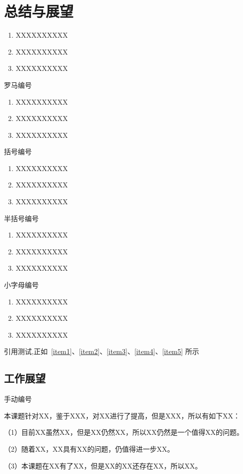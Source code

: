 \lipsum

\newpage    %


\section{总结与展望}

\begin{enumerate}
 \item XXXXXXXXXX
 \label{item1}
 \item XXXXXXXXXX
 \item XXXXXXXXXX
\end{enumerate}
罗马编号
\begin{enumerate}[label=(\roman*)]
 \item XXXXXXXXXX
 \label{item2}
 \item XXXXXXXXXX
 \item XXXXXXXXXX
\end{enumerate}
括号编号
\begin{enumerate}[label=(\arabic*)]
 \item XXXXXXXXXX
 \label{item3}
 \item XXXXXXXXXX
 \item XXXXXXXXXX
\end{enumerate}
半括号编号
\begin{enumerate}[label=\arabic*)]
 \item XXXXXXXXXX
 \label{item4}
 \item XXXXXXXXXX
 \item XXXXXXXXXX
\end{enumerate}
小字母编号
\begin{enumerate}[label=\alph*)]
 \item XXXXXXXXXX
 \label{item5}
 \item XXXXXXXXXX
 \item XXXXXXXXXX
\end{enumerate}

引用测试,正如~\ref{item1}、\ref{item2}、\ref{item3}、\ref{item4}、\ref{item5} 所示

\subsection{工作展望}
手动编号 %

本课题针对XX，鉴于XXX，对XX进行了提高，但是XXX，所以有如下XX：

（1）目前XX虽然XX，但是XX仍然XX，所以XX仍然是一个值得XX的问题。

（2）随着XX，XX具有XX的问题，仍值得进一步XX。

（3）本课题在XX有了XX，但是XX的XX还存在XX，所以XX。


\newpage
